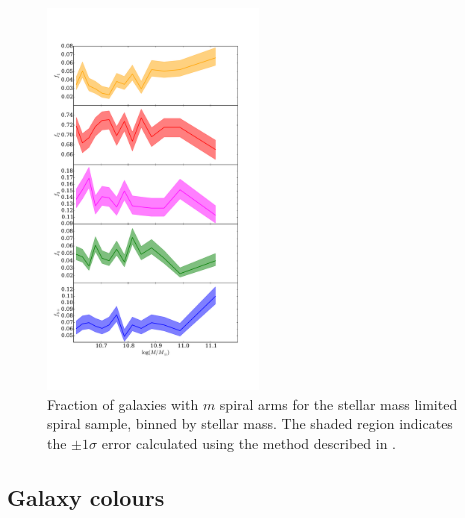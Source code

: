 \documentclass[useAMS,usenatbib]{mn2e}
\begin{document}
\begin{figure}
		\centering

        \includegraphics[width=0.5\textwidth]{Data_imgs/mass_plot.pdf}

        \caption{Fraction of galaxies with $m$ spiral arms for the stellar mass limited spiral sample, binned by stellar mass. The shaded region indicates the $\pm 1 \sigma$ error calculated using the method described in \protect\cite{Cameron_11}.}

        \label{fig:mass_plot}

\end{figure}


\subsection{Galaxy colours}
\end{document}
